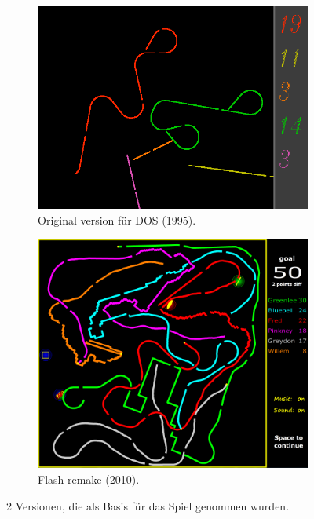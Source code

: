 \documentclass[doktyp=studarbeit]{TUBAFarbeiten}
\begin{document}
\begin{figure}[!htb]
    \centering
    \begin{subfigure}[b]{0.45\textwidth}
		\centering
        \includegraphics[width=1\linewidth]{dos-version.png}
		\caption{Original version für DOS (1995).}
	\end{subfigure}
	\qquad
	\begin{subfigure}[b]{0.45\textwidth}
		\centering
        \includegraphics[width=1\linewidth]{flash-version.png}
        \caption{Flash remake (2010).}
	\end{subfigure}
    \caption{2 Versionen, die als Basis für das Spiel genommen wurden.}
	\label{fig:dos-version}
\end{figure}
\end{document}
